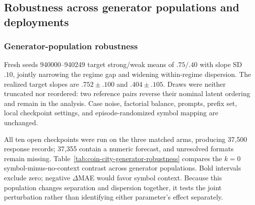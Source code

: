 

\subsection{Robustness across generator populations and deployments}
\label{app:coin-city-robustness}

\subsubsection{Generator-population robustness}
Fresh seeds 940000--940249 target strong/weak means of \(.75/.40\)
with slope SD \(.10\), jointly narrowing the regime gap and widening
within-regime dispersion. The realized target slopes are
\(.752\pm.100\) and \(.404\pm.105\). Draws were neither truncated nor reordered:
two reference pairs reverse their nominal latent ordering and remain in the
analysis. Case noise, factorial balance, prompts, prefix set, local checkpoint
settings, and episode-randomized symbol mapping are unchanged.

All ten open checkpoints were run on the three matched arms, producing 37,500
response records; 37,355 contain a numeric forecast, and unresolved formats remain
missing. Table~\ref{tab:coin-city-generator-robustness} compares the
\(k=0\) symbol-minus-no-context contrast across generator populations. Bold
intervals exclude zero; negative \(\Delta\)MAE would favor symbol context.
Because this population changes separation and dispersion together, it tests the
joint perturbation rather than identifying either parameter's effect separately.

\begin{center}
\begin{minipage}{\linewidth}
\centering
{}
\label{tab:coin-city-generator-robustness}
\scriptsize
\setlength{\tabcolsep}{2.5pt}
\resizebox{\linewidth}{!}{}
\end{minipage}
\end{center}

